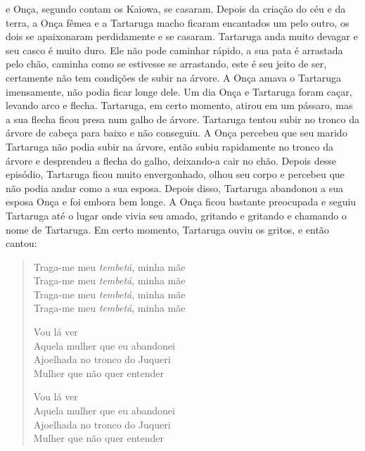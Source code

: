  e Onça, segundo contam os Kaiowa, se casaram. Depois da
criação do céu e da terra, a Onça fêmea e a Tartaruga macho ficaram
encantados um pelo outro, os dois se apaixonaram perdidamente e se
casaram. Tartaruga anda muito devagar e seu casco é muito duro. Ele não
pode caminhar rápido, a sua pata é arrastada pelo chão, caminha como se
estivesse se arrastando, este é seu jeito de ser, certamente não tem
condições de subir na árvore. A Onça amava o Tartaruga imensamente, não
podia ficar longe dele. Um dia Onça e Tartaruga foram caçar, levando
arco e flecha. Tartaruga, em certo momento, atirou em um pássaro, mas a
sua flecha ficou presa num galho de árvore. Tartaruga tentou subir no
tronco da árvore de cabeça para baixo e não conseguiu. A Onça percebeu
que seu marido Tartaruga não podia subir na árvore, então subiu
rapidamente no tronco da árvore e desprendeu a flecha do galho,
deixando-a cair no chão. Depois desse episódio, Tartaruga ficou muito
envergonhado, olhou seu corpo e percebeu que não podia andar como a sua
esposa. Depois disso, Tartaruga abandonou a sua esposa Onça e foi embora
bem longe. A Onça ficou bastante preocupada e seguiu Tartaruga até o
lugar onde vivia seu amado, gritando e gritando e chamando o nome de
Tartaruga. Em certo momento, Tartaruga ouviu os gritos, e então cantou:

\begin{verse}
Traga-me meu \textit{tembetá}, minha mãe\\
Traga-me meu \textit{tembetá}, minha mãe\\
Traga-me meu \textit{tembetá}, minha mãe\\
Traga-me meu \textit{tembetá}, minha mãe

\pagebreak
Vou lá ver\\
Aquela mulher que eu abandonei\\
Ajoelhada no tronco do Juqueri\footnotemark{}\\
Mulher que não quer entender

Vou lá ver\\
Aquela mulher que eu abandonei\\
Ajoelhada no tronco do Juqueri\\
Mulher que não quer entender
\end{verse}


